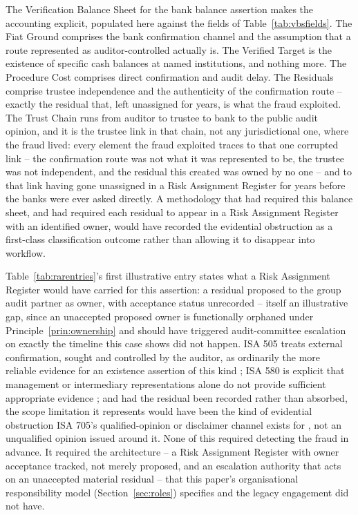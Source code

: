 \documentclass[11pt,a4paper]{article}
\theoremstyle{definition}
\theoremstyle{remark}
\begin{document}
The Verification Balance Sheet for the bank balance assertion makes the accounting explicit, populated here against the fields of Table~\ref{tab:vbsfields}. The Fiat Ground comprises the bank confirmation channel and the assumption that a route represented as auditor-controlled actually is. The Verified Target is the existence of specific cash balances at named institutions, and nothing more. The Procedure Cost comprises direct confirmation and audit delay. The Residuals comprise trustee independence and the authenticity of the confirmation route -- exactly the residual that, left unassigned for years, is what the fraud exploited. The Trust Chain runs from auditor to trustee to bank to the public audit opinion, and it is the trustee link in that chain, not any jurisdictional one, where the fraud lived: every element the fraud exploited traces to that one corrupted link -- the confirmation route was not what it was represented to be, the trustee was not independent, and the residual this created was owned by no one -- and to that link having gone unassigned in a Risk Assignment Register for years before the banks were ever asked directly. A methodology that had required this balance sheet, and had required each residual to appear in a Risk Assignment Register with an identified owner, would have recorded the evidential obstruction as a first-class classification outcome rather than allowing it to disappear into workflow.

Table~\ref{tab:rarentries}'s first illustrative entry states what a Risk Assignment Register would have carried for this assertion: a residual proposed to the group audit partner as owner, with acceptance status unrecorded -- itself an illustrative gap, since an unaccepted proposed owner is functionally orphaned under Principle~\ref{prin:ownership} and should have triggered audit-committee escalation on exactly the timeline this case shows did not happen. ISA 505 treats external confirmation, sought and controlled by the auditor, as ordinarily the more reliable evidence for an existence assertion of this kind \citep{isa505}; ISA 580 is explicit that management or intermediary representations alone do not provide sufficient appropriate evidence \citep{isa580}; and had the residual been recorded rather than absorbed, the scope limitation it represents would have been the kind of evidential obstruction ISA 705's qualified-opinion or disclaimer channel exists for \citep{isa705}, not an unqualified opinion issued around it. None of this required detecting the fraud in advance. It required the architecture -- a Risk Assignment Register with owner acceptance tracked, not merely proposed, and an escalation authority that acts on an unaccepted material residual -- that this paper's organisational responsibility model (Section~\ref{sec:roles}) specifies and the legacy engagement did not have.
\end{document}
